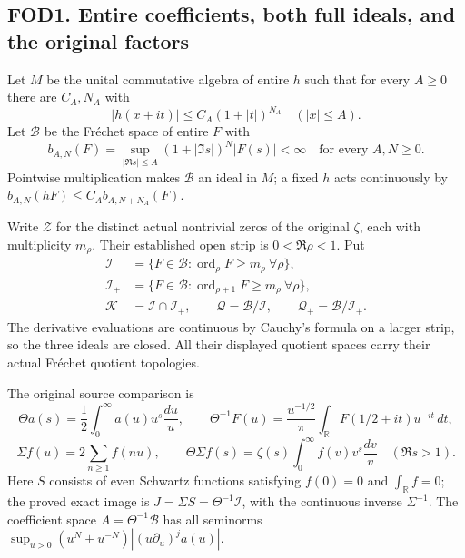 \subsection{FOD1. Entire coefficients, both full ideals, and the
original
factors}\label{fod1.-entire-coefficients-both-full-ideals-and-the-original-factors}

Let \(M\) be the unital commutative algebra of entire \(h\) such that
for every \(A\ge0\) there are \(C_A,N_A\) with \[
 |h(x+it)|\le C_A(1+|t|)^{N_A}\quad(|x|\le A).
\tag{FOD1.1}
\] Let \(\mathcal B\) be the Fréchet space of entire \(F\) with \[
 b_{A,N}(F)=\sup_{|\Re s|\le A}(1+|\Im s|)^N|F(s)|<\infty
 \quad\text{for every }A,N\ge0.
\tag{FOD1.2}
\] Pointwise multiplication makes \(\mathcal B\) an ideal in \(M\); a
fixed \(h\) acts continuously by \(b_{A,N}(hF)\le C_A b_{A,N+N_A}(F)\).

Write \(\mathscr Z\) for the distinct actual nontrivial zeros of the
original \(\zeta\), each with multiplicity \(m_\rho\). Their established
open strip is \(0<\Re\rho<1\). Put \[
\begin{aligned}
\mathcal I&=\{F\in\mathcal B:\operatorname{ord}_\rho F\ge m_\rho\ \forall\rho\},\\
\mathcal I_+&=\{F\in\mathcal B:\operatorname{ord}_{\rho+1}F\ge m_\rho\ \forall\rho\},\\
\mathcal K&=\mathcal I\cap\mathcal I_+,\qquad
\mathcal Q=\mathcal B/\mathcal I,\qquad
\mathcal Q_+=\mathcal B/\mathcal I_+.
\end{aligned}
\tag{FOD1.3}
\] The derivative evaluations are continuous by Cauchy's formula on a
larger strip, so the three ideals are closed. All their displayed
quotient spaces carry their actual Fréchet quotient topologies.

The original source comparison is \[
\Theta a(s)=\frac12\int_0^\infty a(u)u^s\frac{du}{u},\qquad
\Theta^{-1}F(u)=\frac{u^{-1/2}}{\pi}\int_{\mathbb R}F(1/2+it)u^{-it}\,dt,
\] \[
\Sigma f(u)=2\sum_{n\ge1}f(nu),\qquad
\Theta\Sigma f(s)=\zeta(s)\int_0^\infty f(v)v^s\frac{dv}{v}
\quad(\Re s>1).
\tag{FOD1.4}
\] Here \(S\) consists of even Schwartz functions satisfying \(f(0)=0\)
and \(\int_{\mathbb R}f=0\); the proved exact image is
\(J=\Sigma S=\Theta^{-1}\mathcal I\), with the continuous inverse
\(\Sigma^{-1}\). The coefficient space \(A=\Theta^{-1}\mathcal B\) has
all seminorms \(\sup_{u>0}(u^N+u^{-N})|(u\partial_u)^j a(u)|\).

